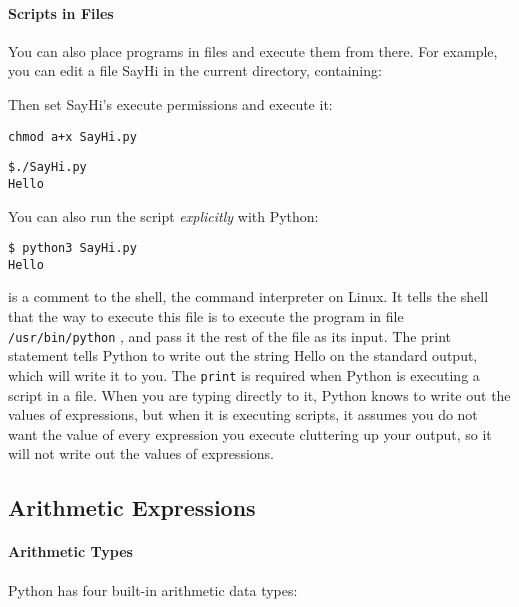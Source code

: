 \paragraph{Scripts in Files}

You can also place programs in
files and execute them from there. For example, you can edit a file
SayHi in the current directory, containing:

\resetlinenumber[1]
\linenumbers
\begin{tt}
  
\end{tt}
\nolinenumbers

Then set SayHi's execute permissions and execute it:

\begin{verbatim}
chmod a+x SayHi.py
\end{verbatim}

\begin{verbatim}
$./SayHi.py
Hello
\end{verbatim}

You can also run the script \emph{explicitly} with Python:

\begin{verbatim}
$ python3 SayHi.py
Hello
\end{verbatim}

is a comment to the shell, the command interpreter on Linux. It tells the
shell that the way to execute this file is to execute the program in
file \texttt{/usr/bin/python} , and pass it the rest of the file as its
input. The print statement tells Python to write out the string Hello on
the standard output, which will write it to you. The \texttt{print} is
required when Python is executing a script in a file. When you are
typing directly to it, Python knows to write out the values of
expressions, but when it is executing scripts, it assumes you do not
want the value of every expression you execute cluttering up your
output, so it will not write out the values of expressions.

\subsection{Arithmetic Expressions}

\paragraph{Arithmetic Types}

Python has four built-in arithmetic data types:

